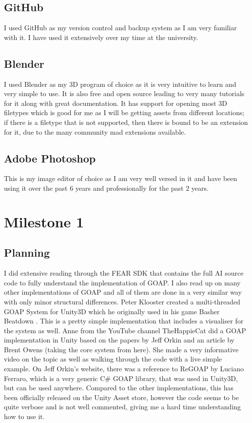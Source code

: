 \documentclass[10pt]{report}
\begin{document}
\subsection{GitHub}
I used GitHub as my version control and backup system as I am very familiar with it. I have used it extensively over my time at the university.

\subsection{Blender}
I used Blender as my 3D program of choice as it is very intuitive to learn and very simple to use. It is also free and open source leading to very many tutorials for it along with great documentation. It has support for opening most 3D filetypes which is good for me as I will be getting assets from different locations; if there is a filetype that is not supported, then there is bound to be an extension for it, due to the many community mad extensions available.

\subsection{Adobe Photoshop}
This is my image editor of choice as I am very well versed in it and have been using it over the past 6 years and professionally for the past 2 years.

\subsection{}


\section{Milestone 1}

\subsection{Planning}
I did extensive reading through the FEAR SDK\cite{fearSDK} that contains the full AI source code to fully understand the implementation of GOAP.
I also read up on many other implementations of GOAP and all of them are done in a very similar way with only minor structural differences. 
Peter Klooster created a multi-threaded GOAP System for Unity3D which he originally used in his game Basher Beatdown \cite{basherGoap}. This is a pretty simple implementation that includes a visualiser for the system as well.
Anne from the YouTube channel TheHappieCat did a GOAP implementation in Unity \cite{happieGoapVideo} based on the papers by Jeff Orkin and an article by Brent Owens \cite{brentOwensGoap} (taking the core system from here). She made a very informative video on the topic as well as walking through the code with a live simple example.
On Jeff Orkin's website, there was a reference to ReGOAP by Luciano Ferraro, which is a very generic C\# GOAP library, that was used in Unity3D, but can be used anywhere. Compared to the other implementations, this has been officially released on the Unity Asset store, however the code seems to be quite verbose and is not well commented, giving me a hard time understanding how to use it.
\end{document}

